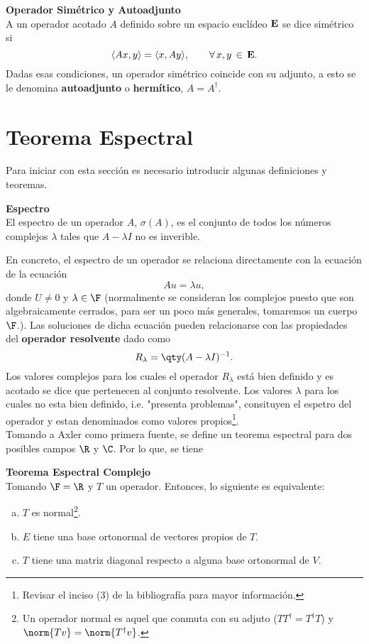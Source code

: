 \begin{mdframed}[style=warning]
	{\large \textbf{Operador Simétrico y Autoadjunto}} \\
	A un operador acotado $A$ definido sobre un espacio euclídeo $\mathbf{E}$ se dice simétrico si
		$$ \langle Ax , y \rangle = \langle x , Ay \rangle, \qquad \forall \, x,y \, \in \, \mathbf{E} . $$
	Dadas esas condiciones, un operador simétrico coincide con su adjunto, a esto se le denomina \textbf{autoadjunto} o \textbf{hermítico}, $A = A^\dagger$.
\end{mdframed}



\section*{Teorema Espectral}
Para iniciar con esta sección es necesario introducir algunas definiciones y teoremas.

\begin{mdframed}[style=warning]
	{\large \textbf{Espectro}} \\
	El espectro de un operador $A$, $\sigma (A)$, es el conjunto de todos los números complejos $\lambda$ tales que $A - \lambda I$ no es inverible.
\end{mdframed}


En concreto, el espectro de un operador se relaciona directamente con la ecuación de la ecuación
	$$ Au = \lambda u, $$
donde $U\neq 0$ y $\lambda \in \F$ (normalmente se consideran los complejos puesto que son algebraicamente cerrados, para ser un poco más generales, tomaremos un cuerpo $\F$.). Las soluciones de dicha ecuación pueden relacionarse con las propiedades del \textbf{operador resolvente} dado como
	$$ R_\lambda = \qty(A - \lambda I)^{-1}. $$
Los valores complejos para los cuales el operador $R_\lambda$ está bien definido y es acotado se dice que pertenecen al conjunto resolvente. Los valores $\lambda$ para los cuales no esta bien definido, i.e. "presenta problemas", consituyen el espetro del operador y estan denominados como valores propios\footnote{Revisar el inciso (3) de la bibliografía para mayor información.}. \\

Tomando a Axler como primera fuente, se define un teorema espectral para dos posibles campos $\R$ y $\C$. Por lo que, se tiene


\begin{mdframed}[style=warning]
	{\large \textbf{Teorema Espectral Complejo}} \\
	Tomando $\F = \R$ y $T$ un operador. Entonces, lo siguiente es equivalente:
	\begin{enumerate}[a)]
		\item $T$ es normal\footnote{Un operador normal es aquel que conmuta con su adjuto ($TT^\dagger = T^\dagger T$) y $\norm{Tv} = \norm{T^\dagger v}$.}.
		\item $E$ tiene una base ortonormal de vectores propios de $T$.
		\item $T$ tiene una matriz diagonal respecto a alguna base ortonormal de $V$.
	\end{enumerate}
\end{mdframed}




